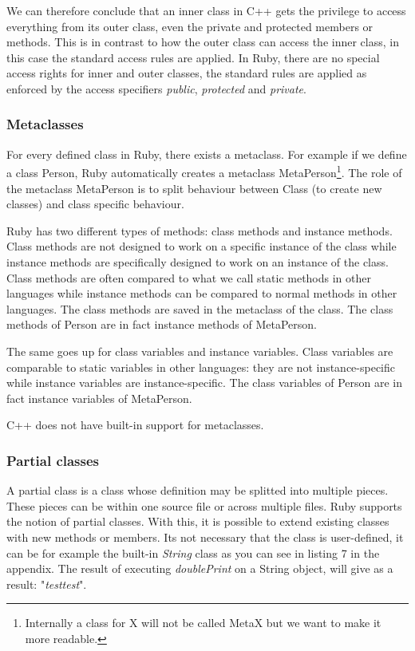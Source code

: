 \documentclass[10pt,a4paper,twocolumn]{article}
\begin{document}
We can therefore conclude that an inner class in C++ gets the privilege to access everything from its outer class, even the private and protected members or methods. This is in contrast to how the outer class can access the inner class, in this case the standard access rules are applied. In Ruby, there are no special access rights for inner and outer classes, the standard rules are applied as enforced by the access specifiers \textit{public}, \textit{protected} and \textit{private}.

\subsubsection{Metaclasses}
For every defined class in Ruby, there exists a metaclass. For example if we define a class Person, Ruby automatically creates a metaclass MetaPerson\footnote{Internally a class for X will not be called MetaX but we want to make it more readable.}. The role of the metaclass MetaPerson is to split behaviour between Class (to create new classes) and class specific behaviour.

Ruby has two different types of methods: class methods and instance methods. Class methods are not designed to work on a specific instance of the class while instance methods are specifically designed to work on an instance of the class. Class methods are often compared to what we call static methods in other languages while instance methods can be compared to normal methods in other languages. The class methods are saved in the metaclass of the class. The class methods of Person are in fact instance methods of MetaPerson.

The same goes up for class variables and instance variables. Class variables are comparable to static variables in other languages: they are not instance-specific while instance variables are instance-specific. The class variables of Person are in fact instance variables of MetaPerson.

C++ does not have built-in support for metaclasses.

\subsubsection{Partial classes}
A partial class is a class whose definition may be splitted into multiple pieces. These pieces can be within one source file or across multiple files. Ruby supports the notion of partial classes. With this, it is possible to extend existing classes with new methods or members. Its not necessary that the class is user-defined, it can be for example the built-in \textit{String} class as you can see in listing 7 in the appendix. The result of executing \textit{doublePrint} on a String object, will give as a result: "\textit{testtest}".
\end{document}
